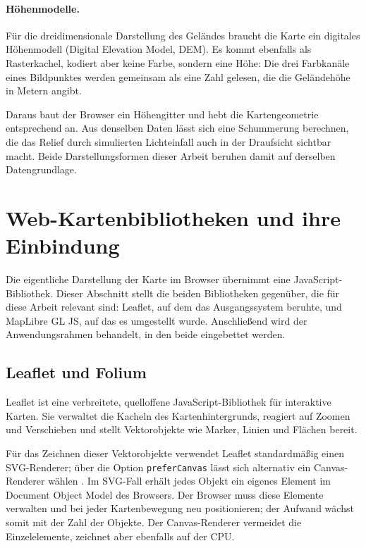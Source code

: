 \documentclass[12pt,a4paper]{report}
\begin{document}
\paragraph{Höhenmodelle.}
\label{subsec:hoehenmodelle}

Für die dreidimensionale Darstellung des Geländes braucht die Karte ein digitales
Höhenmodell (Digital Elevation Model, DEM). Es kommt ebenfalls als Rasterkachel, kodiert
aber keine Farbe, sondern eine Höhe: Die drei Farbkanäle eines Bildpunktes werden gemeinsam
als eine Zahl gelesen, die die Geländehöhe in Metern angibt.

Daraus baut der Browser ein Höhengitter und hebt die Kartengeometrie entsprechend an. Aus
denselben Daten lässt sich eine Schummerung berechnen, die das Relief durch simulierten
Lichteinfall auch in der Draufsicht sichtbar macht. Beide Darstellungsformen dieser Arbeit
beruhen damit auf derselben Datengrundlage.

\section{Web-Kartenbibliotheken und ihre Einbindung}
\label{sec:bibliotheken}

Die eigentliche Darstellung der Karte im Browser übernimmt eine JavaScript-Bibliothek.
Dieser Abschnitt stellt die beiden Bibliotheken gegenüber, die für diese Arbeit relevant
sind: Leaflet, auf dem das Ausgangssystem beruhte, und MapLibre GL JS, auf das es
umgestellt wurde. Anschließend wird der Anwendungsrahmen behandelt, in den beide
eingebettet werden.

\subsection{Leaflet und Folium}
\label{subsec:leaflet}

Leaflet ist eine verbreitete, quelloffene JavaScript-Bibliothek für interaktive Karten. Sie
verwaltet die Kacheln des Kartenhintergrunds, reagiert auf Zoomen und Verschieben und
stellt Vektorobjekte wie Marker, Linien und Flächen bereit.

Für das Zeichnen dieser Vektorobjekte verwendet Leaflet standardmäßig einen SVG-Renderer;
über die Option \texttt{preferCanvas} lässt sich alternativ ein Canvas-Renderer wählen
\cite{LeafletDocs}. Im SVG-Fall erhält jedes Objekt ein eigenes Element im Document Object
Model des Browsers. Der Browser muss diese Elemente verwalten und bei jeder Kartenbewegung
neu positionieren; der Aufwand wächst somit mit der Zahl der Objekte. Der Canvas-Renderer
vermeidet die Einzelelemente, zeichnet aber ebenfalls auf der CPU.
\end{document}
